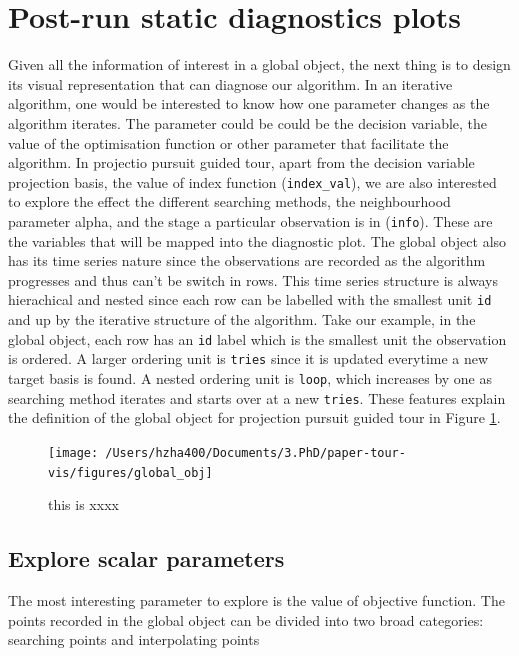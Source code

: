 \documentclass[12pt]{article}
\begin{document}
\hypertarget{post-run-static-diagnostics-plots}{%
\section{Post-run static diagnostics
plots}\label{post-run-static-diagnostics-plots}}

Given all the information of interest in a global object, the next thing
is to design its visual representation that can diagnose our algorithm.
In an iterative algorithm, one would be interested to know how one
parameter changes as the algorithm iterates. The parameter could be
could be the decision variable, the value of the optimisation function
or other parameter that facilitate the algorithm. In projectio pursuit
guided tour, apart from the decision variable projection basis, the
value of index function (\texttt{index\_val}), we are also interested to
explore the effect the different searching methods, the neighbourhood
parameter alpha, and the stage a particular observation is in
(\texttt{info}). These are the variables that will be mapped into the
diagnostic plot. The global object also has its time series nature since
the observations are recorded as the algorithm progresses and thus can't
be switch in rows. This time series structure is always hierachical and
nested since each row can be labelled with the smallest unit \texttt{id}
and up by the iterative structure of the algorithm. Take our example, in
the global object, each row has an \texttt{id} label which is the
smallest unit the observation is ordered. A larger ordering unit is
\texttt{tries} since it is updated everytime a new target basis is
found. A nested ordering unit is \texttt{loop}, which increases by one
as searching method iterates and starts over at a new \texttt{tries}.
These features explain the definition of the global object for
projection pursuit guided tour in Figure \ref{fig:glb-obj}.

\begin{figure}
\texttt{[image: /Users/hzha400/Documents/3.PhD/paper-tour-vis/figures/global\_obj]} \caption{\label{glb-obj}this is xxxx}\label{fig:glb-obj}
\end{figure}

\hypertarget{explore-scalar-parameters}{%
\subsection{Explore scalar parameters}\label{explore-scalar-parameters}}

The most interesting parameter to explore is the value of objective
function. The points recorded in the global object can be divided into
two broad categories: searching points and interpolating points
\end{document}

